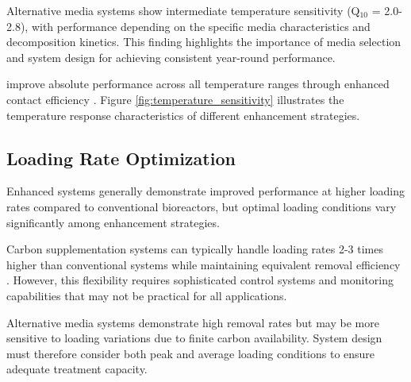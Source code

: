 \documentclass[12pt,a4paper]{article}
\begin{document}
Alternative media systems show intermediate temperature sensitivity (Q$_{10}$ = 2.0-2.8), with performance depending on the specific media characteristics and decomposition kinetics.  This finding highlights the importance of media selection and system design for achieving consistent year-round performance.

 improve absolute performance across all temperature ranges through enhanced contact efficiency \citep{RN632}. Figure \ref{fig:temperature_sensitivity} illustrates the temperature response characteristics of different enhancement strategies.

\subsection{Loading Rate Optimization}

 Enhanced systems generally demonstrate improved performance at higher loading rates compared to conventional bioreactors, but optimal loading conditions vary significantly among enhancement strategies.

Carbon supplementation systems can typically handle loading rates 2-3 times higher than conventional systems while maintaining equivalent removal efficiency \citep{RN312, RN310}.  However, this flexibility requires sophisticated control systems and monitoring capabilities that may not be practical for all applications.

Alternative media systems demonstrate high removal rates but may be more sensitive to loading variations due to finite carbon availability.  System design must therefore consider both peak and average loading conditions to ensure adequate treatment capacity.
\end{document}
